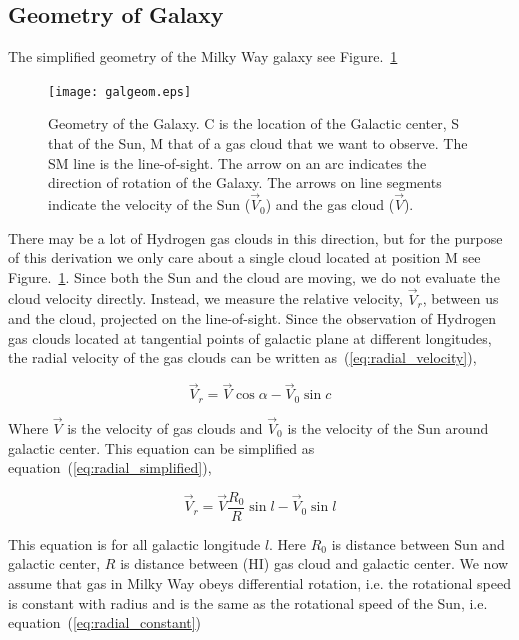 \documentclass[10pt,conference]{IEEEtran}
\begin{document}
\subsection{Geometry of Galaxy}

The simplified geometry of the Milky Way galaxy\cite{CathyHorellou2015} see Figure.~\ref{fig:galgeo_figure}

\begin{figure}[htbp]
 \texttt{[image: galgeom.eps]}
 \caption{Geometry of the Galaxy. C is the location of the Galactic center, S that of the Sun, M
that of a gas cloud that we want to observe. The SM line is the line-of-sight. The arrow
on an arc indicates the direction of rotation of the Galaxy. The arrows on line segments
indicate the velocity of the Sun ($\vec{V}_0$) and the gas cloud ($\vec{V}$)\cite{CathyHorellou2015}.}
 \label{fig:galgeo_figure}
\end{figure}

There may be a lot of Hydrogen gas clouds in this direction, but for the purpose of this derivation we only care about a single cloud located at position M see Figure.~\ref{fig:galgeo_figure}. Since both the Sun and the cloud are moving, we do not evaluate the cloud velocity directly. Instead, we measure the relative velocity, $\vec{V}_{r}$, between us and the cloud, projected on the line-of-sight\cite{CathyHorellou2015}. Since the observation of Hydrogen gas clouds located at tangential points of galactic plane at different longitudes, the radial velocity of the gas clouds can be written as~(\ref{eq:radial_velocity}),

\begin{equation}
  \vec{V}_{r}=\vec{V}\cos\alpha-\vec{V}_{0}\sin c
  \label{eq:radial_velocity}
\end{equation}

Where $\vec{V}$ is the velocity of gas clouds and $\vec{V}_{0}$ is the velocity of the Sun around galactic center. This equation can be simplified as equation~(\ref{eq:radial_simplified}),

\begin{equation}
 \vec{V}_{r}=\vec{V}\frac{\mathit{R}_{0}}{\mathit{R}}\sin l-\vec{V}_{0}\sin l
 \label{eq:radial_simplified}
\end{equation} 

This equation is for all galactic longitude $\mathit{l}$. Here $\mathit{R}_{0}$ is distance between Sun and galactic center, $\mathit{R}$ is distance between (HI) gas cloud and galactic center. We now assume that gas in Milky Way obeys differential rotation, i.e. the rotational speed is constant with radius and is the same as the rotational speed of the Sun, i.e. equation~(\ref{eq:radial_constant})
\end{document}
